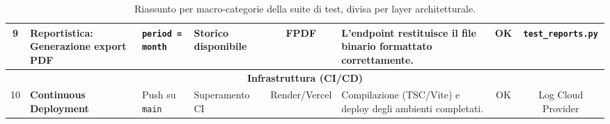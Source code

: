 \begin{table}[H]
{\begin{tabular}{|c|p{3.5cm}|p{2cm}|p{2.5cm}|c|p{3.5cm}|c|c|}
9 & \textbf{Reportistica:} Generazione export PDF & \texttt{period = month} & Storico disponibile & FPDF & L'endpoint restituisce il file binario formattato correttamente. & OK & \texttt{test\_reports.py} \\ \hline
\multicolumn{8}{|c|}{\textbf{Infrastruttura (CI/CD)}} \\ \hline
10 & \textbf{Continuous Deployment} & Push su \texttt{main} & Superamento CI & Render/Vercel & Compilazione (TSC/Vite) e deploy degli ambienti completati. & OK & Log Cloud Provider \\ \hline
\end{tabular}%
}
\caption{Riassunto per macro-categorie della suite di test, divisa per layer architetturale.}
\end{table}